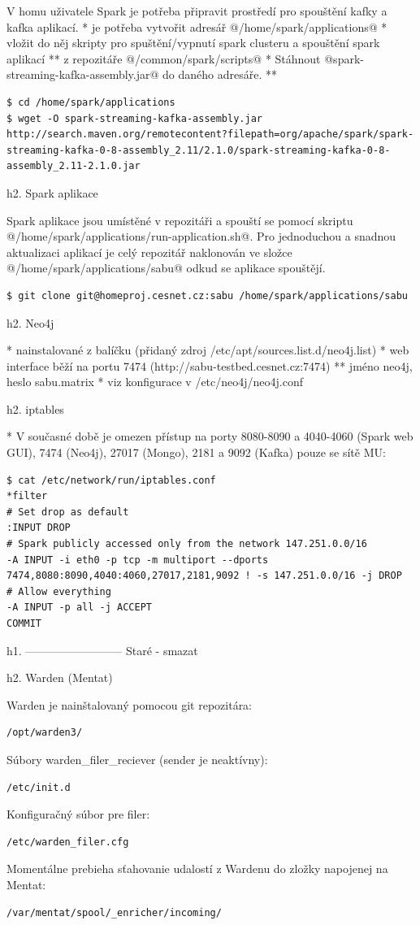 \documentclass[a4paper]{article} %
\begin{document}
V homu uživatele Spark je potřeba připravit prostředí pro spouštění kafky a kafka aplikací.
* je potřeba vytvořit adresář @/home/spark/applications@
* vložit do něj skripty pro spuštění/vypnutí spark clusteru a spouštění spark aplikací
** z repozitáře @/common/spark/scripts@
* Stáhnout @spark-streaming-kafka-assembly.jar@ do daného adresáře.
** \begin{lstlisting}[]
$ cd /home/spark/applications
$ wget -O spark-streaming-kafka-assembly.jar http://search.maven.org/remotecontent?filepath=org/apache/spark/spark-streaming-kafka-0-8-assembly_2.11/2.1.0/spark-streaming-kafka-0-8-assembly_2.11-2.1.0.jar
\end{lstlisting}

h2. Spark aplikace

Spark aplikace jsou umístěné v repozitáři a spouští se pomocí skriptu @/home/spark/applications/run-application.sh@.
Pro jednoduchou a snadnou aktualizaci aplikací je celý repozitář naklonován ve složce @/home/spark/applications/sabu@ odkud se aplikace spouštějí.

\begin{lstlisting}[]
$ git clone git@homeproj.cesnet.cz:sabu /home/spark/applications/sabu
\end{lstlisting}

h2. Neo4j

* nainstalované z balíčku (přidaný zdroj /etc/apt/sources.list.d/neo4j.list)
* web interface běží na portu 7474 (http://sabu-testbed.cesnet.cz:7474)
** jméno neo4j, heslo sabu.matrix
* viz konfigurace v /etc/neo4j/neo4j.conf

h2. iptables

* V současné době je omezen přístup na porty 8080-8090 a 4040-4060 (Spark web GUI), 7474 (Neo4j), 27017 (Mongo), 2181 a 9092 (Kafka) pouze se sítě MU:
\begin{lstlisting}[]
$ cat /etc/network/run/iptables.conf
*filter
# Set drop as default
:INPUT DROP
# Spark publicly accessed only from the network 147.251.0.0/16
-A INPUT -i eth0 -p tcp -m multiport --dports 7474,8080:8090,4040:4060,27017,2181,9092 ! -s 147.251.0.0/16 -j DROP
# Allow everything
-A INPUT -p all -j ACCEPT
COMMIT
\end{lstlisting}

h1. --------------------------
Staré - smazat

h2. Warden (Mentat)

Warden je nainštalovaný pomocou git repozitára:
\begin{lstlisting}[]/opt/warden3/\end{lstlisting}
Súbory warden_filer_reciever (sender je neaktívny):
\begin{lstlisting}[]/etc/init.d\end{lstlisting}
Konfiguračný súbor pre filer:
\begin{lstlisting}[]/etc/warden_filer.cfg\end{lstlisting}
Momentálne prebieha sťahovanie udalostí z Wardenu do zložky napojenej na Mentat:
\begin{lstlisting}[]/var/mentat/spool/_enricher/incoming/\end{lstlisting}
\end{document}
